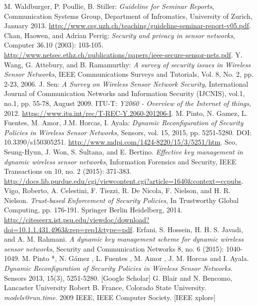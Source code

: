 \documentclass[12pt,a4paper,twoside]{report}
\begin{document}
\begin{thebibliography}{01}
 M. Waldburger, P. Poullie, B. Stiller: \emph{Guideline for Seminar Reports}, Communication Systems Group, Department of Infromatics, University of Zurich, January 2013. \url{http://www.csg.uzh.ch/teaching/guideline-seminar-report-v05.pdf}.
 Chan, Haowen, and Adrian Perrig: \emph{Security and privacy in sensor networks}, Computer 36.10 (2003): 103-105. \url{http://www.netsec.ethz.ch/publications/papers/ieee-secure-sensor-nets.pdf}.
 Y. Wang, G. Attebury, and B. Ramamurthy: \emph{A survey of security issues in Wireless Sensor Networks}, IEEE Communications Surveys and Tutorials, Vol. 8, No. 2, pp. 2-23, 2006.
 J. Sen: \emph{A Survey on Wireless Sensor Network Security}, International Journal of Communication Networks and Information Security (IJCNIS), vol.1, no.1, pp. 55-78, August 2009.
 ITU-T: \emph{Y2060 - Overview of the Internet of things}, 2012. \url{https://www.itu.int/rec/T-REC-Y.2060-201206-I}.
 M. Pinto, N. Gamez, L. Fuentes, M. Amor, J.M. Horcas, I. Ayala: \emph{Dynamic Reconfiguration of Security Policies in Wireless Sensor Networks}, Sensors, vol. 15, 2015, pp. 5251-5280. DOI: 10.3390/s150305251. \url{http://www.mdpi.com/1424-8220/15/3/5251/htm}.
 Seo, Seung-Hyun, J. Won, S. Sultana, and E. Bertino. \emph{Effective key management in dynamic wireless sensor networks}, Information Forensics and Security, IEEE Transactions on 10, no. 2 (2015): 371-383. \url{http://docs.lib.purdue.edu/cgi/viewcontent.cgi?article=1640&context=ccpubs}.
 Vigo, Roberto, A. Celestini, F. Tiezzi, R. De Nicola, F. Nielson, and H. R. Nielson. \emph{Trust-based Enforcement of Security Policies}, In Trustworthy Global Computing, pp. 176-191. Springer Berlin Heidelberg, 2014. \url{http://citeseerx.ist.psu.edu/viewdoc/download?doi=10.1.1.431.4963&rep=rep1&type=pdf}.
 Erfani, S. Hossein, H. H. S. Javadi, and A. M. Rahmani. \emph{A dynamic key management scheme for dynamic wireless sensor networks}, Security and Communication Networks 8, no. 6 (2015): 1040-1049.
 M. Pinto *, N. G\'{a}mez , L. Fuentes , M. Amor , J. M. Horcas and I. Ayala. \emph{Dynamic Reconfiguration of Security Policies in Wireless Sensor Networks}. Sensors 2013, 15(3), 5251-5280. [Google Scholar]
 G. Blair and N. Bencomo, Lancaster University Robert B. France, Colorado State University. \emph{models@run.time}. 2009 IEEE, IEEE Computer Society. [IEEE xplore]

\end{thebibliography}
\end{document}
